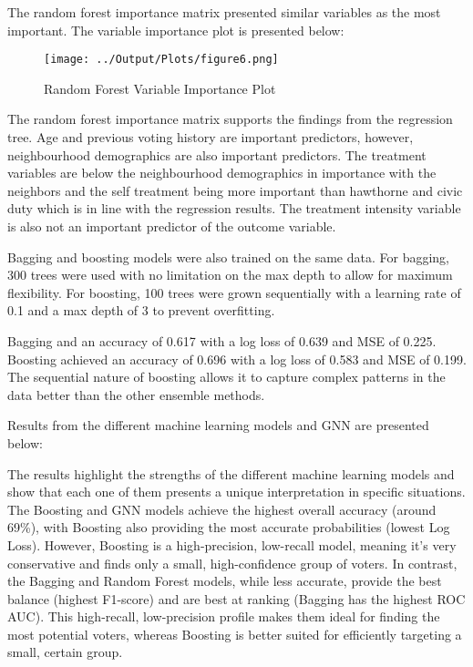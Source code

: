 \documentclass[11pt]{article}
\begin{document}
The random forest importance matrix presented similar variables as the most important. The variable importance plot is presented below:
\begin{figure}[H]
    \centering
    \texttt{[image: ../Output/Plots/figure6.png]}   
    \caption{Random Forest Variable Importance Plot}
    \label{fig:random_forest}
\end{figure}
The random forest importance matrix supports the findings from the regression tree. Age and previous voting history are important predictors, however, neighbourhood demographics are also important predictors. The treatment variables are below the neighbourhood demographics in importance with the neighbors and the self treatment being more important than hawthorne and civic duty which is in line with the regression results. The treatment intensity variable is also not an important predictor of the outcome variable.

Bagging and boosting models were also trained on the same data. For bagging, 300 trees were used with no limitation on the max depth to allow for maximum flexibility. For boosting, 100 trees were grown sequentially with a learning rate of 0.1 and a max depth of 3 to prevent overfitting.

Bagging and an accuracy of 0.617 with a log loss of 0.639 and MSE of 0.225. Boosting achieved an accuracy of 0.696 with a log loss of 0.583 and MSE of 0.199. The sequential nature of boosting allows it to capture complex patterns in the data better than the other ensemble methods.

Results from the different machine learning models and GNN are presented below:


The results highlight the strengths of the different machine learning models and show that each one of them presents a unique interpretation in specific situations. The Boosting and GNN models achieve the highest overall accuracy (around 69\%), with Boosting also providing the most accurate probabilities (lowest Log Loss). However, Boosting is a high-precision, low-recall model, meaning it's very conservative and finds only a small, high-confidence group of voters. In contrast, the Bagging and Random Forest models, while less accurate, provide the best balance (highest F1-score) and are best at ranking (Bagging has the highest ROC AUC). This high-recall, low-precision profile makes them ideal for finding the most potential voters, whereas Boosting is better suited for efficiently targeting a small, certain group.
\end{document}
